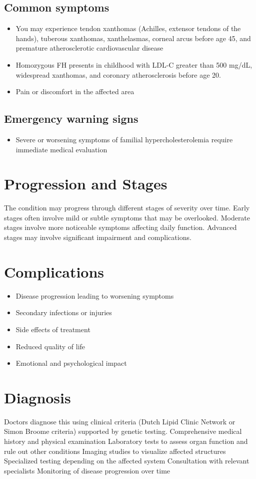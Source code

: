 \subsection{Common symptoms}
\begin{itemize}[noitemsep]
  \item You may experience tendon xanthomas (Achilles, extensor tendons of the hands), tuberous xanthomas, xanthelasmas, corneal arcus before age 45, and premature atherosclerotic cardiovascular disease
  \item Homozygous FH presents in childhood with LDL-C greater than 500 mg/dL, widespread xanthomas, and coronary atherosclerosis before age 20.
  \item Pain or discomfort in the affected area
  \end{itemize}

\subsection{Emergency warning signs}
\begin{itemize}[noitemsep]
  \item Severe or worsening symptoms of familial hypercholesterolemia require immediate medical evaluation
\end{itemize}
\section{Progression and Stages}
The condition may progress through different stages of severity over time. Early stages often involve mild or subtle symptoms that may be overlooked. Moderate stages involve more noticeable symptoms affecting daily function. Advanced stages may involve significant impairment and complications.
\section{Complications}
\begin{itemize}[noitemsep]
  \item Disease progression leading to worsening symptoms
  \item Secondary infections or injuries
  \item Side effects of treatment
  \item Reduced quality of life
  \item Emotional and psychological impact
\end{itemize}
\section{Diagnosis}
Doctors diagnose this using clinical criteria (Dutch Lipid Clinic Network or Simon Broome criteria) supported by genetic testing. Comprehensive medical history and physical examination Laboratory tests to assess organ function and rule out other conditions Imaging studies to visualize affected structures Specialized testing depending on the affected system Consultation with relevant specialists Monitoring of disease progression over time

